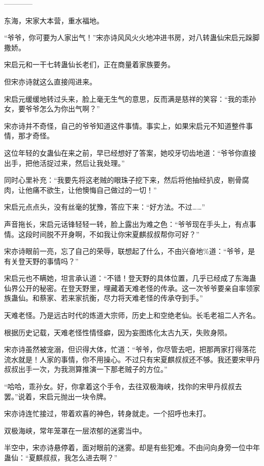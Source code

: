 
\begin{this_body}

------------

东海，宋家大本营，重水福地。

“爷爷，你可要为人家出气！”宋亦诗风风火火地冲进书房，对八转蛊仙宋启元跺脚撒娇。

宋启元和一干七转蛊仙长老们，正在商量着家族要务。

但宋亦诗就这么直接闯进来。

宋启元缓缓地转过头来，脸上毫无生气的意思，反而满是慈祥的笑容：“我的乖孙女，要爷爷怎么为你出气啊？”

宋亦诗并不奇怪，自己的爷爷知道这件事情。事实上，如果宋启元不知道整件事情，那才奇怪。

这位年轻的女蛊仙在来之前，早已经想好了答案，她咬牙切齿地道：“爷爷你直接出手，把他活捉过来，然后让我处理。”

同时心里补充：“我要先将这老贼的眼珠子挖下来，然后将他抽经扒皮，剔骨腐肉，让他痛不欲生，让他懊悔自己做过的一切！”

宋启元点点头，没有丝毫的犹豫，答应下来：“好方法。不过……”

声音拖长，宋启元话锋轻轻一转，脸上露出为难之色：“爷爷现在手头上，有点事情。这段时间脱不开身啊，不如我让你宋夏麒叔叔帮你可好？”

宋亦诗眼前一亮，忘了自己的荣辱，联想起了什么，不由兴奋地\%道：“爷爷，是有关登天野的事情吗？”

宋启元也不瞒她，坦言承认道：“不错！登天野的具体位置，几乎已经成了东海蛊仙界公开的秘密。在登天野里，埋藏着天难老怪的传承。这一次爷爷要亲自率领家族蛊仙。和蔡家、若来家抗衡，尽力将天难老怪的传承夺到手。”

天难老怪。乃是远古时代的炼道大宗师，历史上和空绝老仙。长毛老祖二人齐名。

根据历史记载，天难老怪性情怪癖，因为妄图炼化太古九天，失败身陨。

宋亦诗虽然被宠溺，但识得大体，忙道：“爷爷，你尽管去吧，把那两家打得落花流水就是！人家的事情，你不用操心。不过只有宋夏麒叔叔还不够。我还要宋甲丹叔叔出手一次，为我测算推演一下那老贼子的方位。”

“哈哈，乖孙女。好，你拿着这个手令，去往双极海峡，找你的宋甲丹叔叔去罢。”说着，宋启元抛出一块令牌。

宋亦诗连忙接过，带着欢喜的神色，转身就走。一个招呼也未打。

双极海峡，常年笼罩在一层浓郁的迷雾当中。

半空中，宋亦诗悬停着，面对眼前的迷雾。却是有些犯难。不由问向身旁一位中年蛊仙：“夏麒叔叔，我怎么进去啊？”


\end{this_body}
